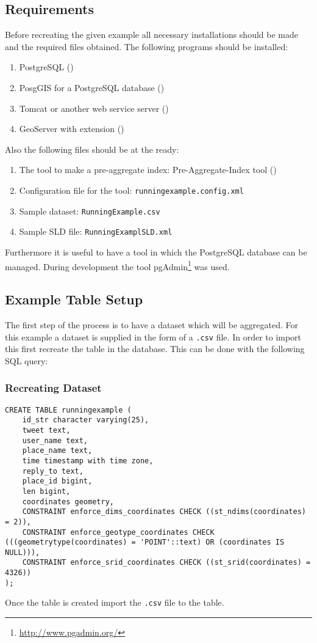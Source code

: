 
\subsection{Requirements}
Before recreating the given example all necessary installations should be made and the required files obtained. The following programs should be installed:
\begin{enumerate}
	\item PostgreSQL ()
	\item PosgGIS for a PostgreSQL database ()
	\item Tomcat or another web service server ()
	\item GeoServer with extension ()
\end{enumerate}
Also the following files should be at the ready:
\begin{enumerate}
	\item The tool to make a pre-aggregate index: Pre-Aggregate-Index tool ()
	\item Configuration file for the tool: \lstinline|runningexample.config.xml|
	\item Sample dataset: \lstinline|RunningExample.csv|
	\item Sample SLD file: \lstinline|RunningExamplSLD.xml|
\end{enumerate}
Furthermore it is useful to have a tool in which the PostgreSQL database can be managed. During development the tool pgAdmin\footnote{\url{http://www.pgadmin.org/}} was used.

\subsection{Example Table Setup}
The first step of the process is to have a dataset which will be aggregated. For this example a dataset is supplied in the form of a \lstinline|.csv| file. In order to import this first recreate the table in the database. This can be done with the following SQL query:
\subsubsection{Recreating Dataset}
\begin{lstlisting}
CREATE TABLE runningexample (
	id_str character varying(25),
	tweet text,
	user_name text,
	place_name text,
	time timestamp with time zone,
	reply_to text,
	place_id bigint,
	len bigint,
	coordinates geometry,
	CONSTRAINT enforce_dims_coordinates CHECK ((st_ndims(coordinates) = 2)),
	CONSTRAINT enforce_geotype_coordinates CHECK (((geometrytype(coordinates) = 'POINT'::text) OR (coordinates IS NULL))),
	CONSTRAINT enforce_srid_coordinates CHECK ((st_srid(coordinates) = 4326))
);
\end{lstlisting}
Once the table is created import the \lstinline|.csv| file to the table.

